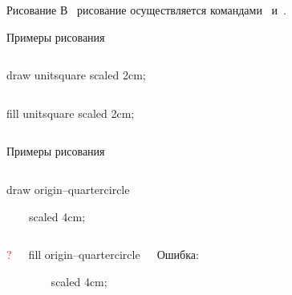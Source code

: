

\begin{frame}{Рисование}
\large
В~ рисование осуществляется командами
~и~.
\end{frame}


\begin{frame}{Примеры рисования}
\begin{columns}
\centerline{}%
\begin{programlisting}
\alert{draw} unitsquare scaled 2cm;
\end{programlisting}
\end{columns}
\bigskip
\begin{columns}
\centerline{}%
\begin{programlisting}
\alert{fill} unitsquare scaled 2cm;
\end{programlisting}
\end{columns}
\end{frame}


\begin{frame}{Примеры рисования}
\begin{columns}
\centerline{}%
\begin{programlisting}
\alert{draw} origin--quartercircle\par
~~~~scaled 4cm;
\end{programlisting}
\end{columns}
\bigskip
\begin{columns}
\centerline{\fontsize{48}{56}\selectfont\textcolor{red}{?}}%
\begin{programlisting}
\alert{fill} origin--quartercircle\par
~~~~scaled 4cm;
\end{programlisting}
Ошибка:
\begin{screen}
\strut
{}%
%
\end{screen}
\end{columns}
\end{frame}

